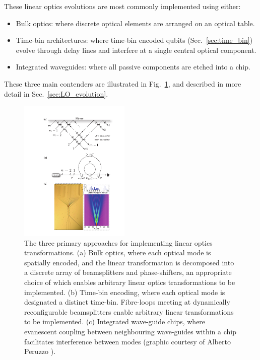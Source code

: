 These linear optics evolutions are most commonly implemented using either:
\begin{itemize}
\item Bulk optics: where discrete optical elements are arranged on an optical table.
\item Time-bin architectures: where time-bin encoded qubits (Sec.~\ref{sec:time_bin}) evolve through delay lines and interfere at a single central optical component.
\item Integrated waveguides: where all passive components are etched into a chip.
\end{itemize}
These three main contenders are illustrated in Fig.~\ref{fig:LO_archs}, and described in more detail in Sec.~\ref{sec:LO_evolution}.

\begin{figure}[!htb]
\includegraphics[width=0.47\textwidth]{LO_archs}
\caption{The three primary approaches for implementing linear optics transformations. (a) Bulk optics, where each optical mode is spatially encoded, and the linear transformation is decomposed into a discrete array of beamsplitters and phase-shifters, an appropriate choice of which enables arbitrary linear optics transformations to be implemented. (b) Time-bin encoding, where each optical mode is designated a distinct time-bin. Fibre-loops meeting at dynamically reconfigurable beamsplitters enable arbitrary linear transformations to be implemented. (c) Integrated wave-guide chips, where evanescent coupling between neighbouring wave-guides within a chip facilitates interference between modes (graphic courtesy of Alberto Peruzzo \cite{bib:PeruzzoQW}).} \label{fig:LO_archs}
\end{figure}

